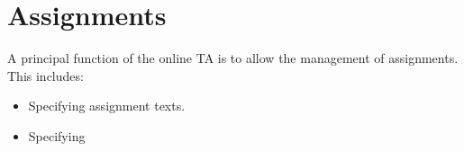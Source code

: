 
\section{Assignments}

A principal function of the online TA is to allow the management of
assignments. This includes:

\begin{itemize}

\item Specifying assignment texts.

\item Specifying

\end{itemize}
